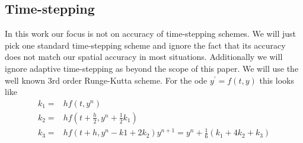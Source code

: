 \documentclass[10]{amsart}
\begin{document}
 \subsection{Time-stepping}
 In this work our focus is not on accuracy of time-stepping schemes. We will just pick one standard
 time-stepping scheme and ignore the fact that its accuracy does not match our spatial accuracy in most situations.
 Additionally we will ignore adaptive time-stepping as beyond the
 scope of this paper. We will use the well known $3$rd order Runge-Kutta scheme. For the ode $y^{'}=f(t,y)$ this looks like
 \begin{align*}
  k_1=&hf(t,y^n)\\
  k_2=&h f(t+\frac{h}{2},y^n+\frac{1}{2}k_1)\\
  k_3=&h f(t+h,y^n - k1 +2 k_2)
  y^{n+1}=y^n+\frac{1}{6} \left(k_1 + 4 k_2 + k_3\right)
 \end{align*}

 
\end{document}
